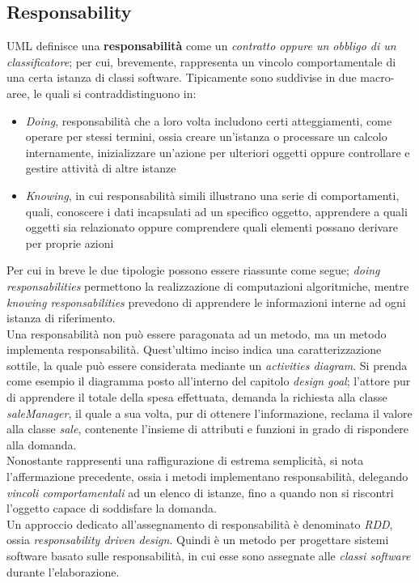 \documentclass{article}
\begin{document}
\subsection*{Responsability}
\large
UML definisce una \textbf{responsabilità} come un \textit{contratto oppure un obbligo di un classificatore}; per cui, brevemente, rappresenta un vincolo comportamentale di una certa istanza di classi software. Tipicamente sono suddivise in due macro-aree, le quali si contraddistinguono in:
\begin{itemize}[label={-}]
    \itemsep0em
    \item \textit{Doing}, responsabilità che a loro volta includono certi atteggiamenti, come operare per stessi termini, ossia creare un'istanza o processare un calcolo internamente, inizializzare un'azione per ulteriori oggetti oppure controllare e gestire attività di altre istanze
    \item \textit{Knowing}, in cui responsabilità simili illustrano una serie di comportamenti, quali, conoscere i dati incapsulati ad un specifico oggetto, apprendere a quali oggetti sia relazionato oppure comprendere quali elementi possano derivare per proprie azioni
\end{itemize}
Per cui in breve le due tipologie possono essere riassunte come segue; \textit{doing responsabilities} permettono la realizzazione di computazioni algoritmiche, mentre \textit{knowing responsabilities} prevedono di apprendere le informazioni interne ad ogni istanza di riferimento.\vspace*{14pt}\\
Una responsabilità non può essere paragonata ad un metodo, ma un metodo implementa responsabilità. Quest'ultimo inciso indica una caratterizzazione sottile, la quale può essere considerata mediante un \textit{activities diagram}. Si prenda come esempio il diagramma posto all'interno del capitolo \textit{design goal}; l'attore pur di apprendere il totale della spesa effettuata, demanda la richiesta alla classe \textit{saleManager}, il quale a sua volta, pur di ottenere l'informazione, reclama il valore alla classe \textit{sale}, contenente l'insieme di attributi e funzioni in grado di rispondere alla domanda.\vspace*{14pt}\\
Nonostante rappresenti una raffigurazione di estrema semplicità, si nota l'affermazione precedente, ossia i metodi implementano responsabilità, delegando \textit{vincoli comportamentali} ad un elenco di istanze, fino a quando non si riscontri l'oggetto capace di soddisfare la domanda.\vspace*{14pt}\\
Un approccio dedicato all'assegnamento di responsabilità è denominato \textit{RDD}, ossia \textit{responsability driven design}. Quindi è un metodo per progettare sistemi software basato sulle responsabilità, in cui esse sono assegnate alle \textit{classi software} durante l'elaborazione.
\end{document}
